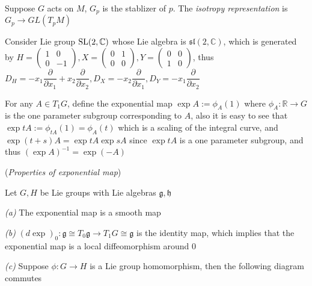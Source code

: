 \documentclass[main]{subfiles}
\begin{document}
\begin{definition}
Suppose $G$ acts on $M$, $G_p$ is the stablizer of $p$. The \textit{isotropy representation} is $G_p\to GL(T_pM)$
\end{definition}

\begin{example}
Consider Lie group $\operatorname{SL}(2,\mathbb C)$ whose Lie algebra is $\mathfrak{sl}(2,\mathbb C)$, which is generated by $H=\begin{pmatrix}
1&0 \\
0&-1
\end{pmatrix},X=\begin{pmatrix}
0&1 \\
0&0
\end{pmatrix},Y=\begin{pmatrix}
0&0 \\
1&0
\end{pmatrix}$, thus $D_H=-x_1\dfrac{\partial}{\partial x_1}+x_2\dfrac{\partial}{\partial x_2},D_X=-x_2\dfrac{\partial}{\partial x_1},D_Y=-x_1\dfrac{\partial}{\partial x_2}$
\end{example}

\begin{definition}
For any $A\in T_1G$, define the exponential map $\exp A:=\phi_A(1)$ where $\phi_A:\mathbb R\to G$ is the one parameter subgroup corresponding to $A$, also it is easy to see that $\exp tA:=\phi_{tA}(1)=\phi_A(t)$ which is a scaling of the integral curve, and $\exp(t+s)A=\exp tA\exp sA$ since $\exp tA$ is a one parameter subgroup, and thus $(\exp A)^{-1}=\exp(-A)$
\end{definition}

\begin{proposition}(\textit{Properties of exponential map})\label{Properties of exponential map} \par
Let $G,H$ be Lie groups with Lie algebras $\mathfrak{g},\mathfrak{h}$ \par
\textit{(a) }The exponential map is a smooth map \par
\textit{(b) }$(d\exp)_0:\mathfrak g\cong T_0\mathfrak{g}\to T_1G\cong\mathfrak{g}$ is the identity map, which implies that the exponential map is a local diffeomorphism around $0$ \par
\textit{(c) }Suppose $\phi:G\to H$ is a Lie group homomorphism, then the following diagram commutes
\begin{center}
\end{center}
\end{proposition}
\end{document}
